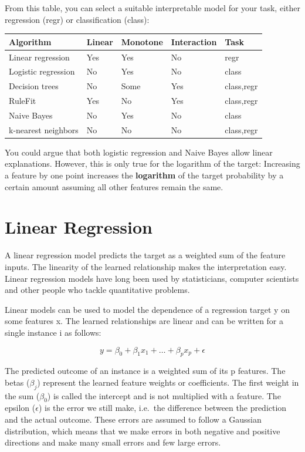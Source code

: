 \documentclass[
  10pt,
]{scrbook}
\begin{document}
From this table, you can select a suitable interpretable model for your task, either regression (regr) or classification (class):

\begin{longtable}[]{@{}lllll@{}}
\toprule
Algorithm & Linear & Monotone & Interaction & Task\tabularnewline
\midrule
\endhead
Linear regression & Yes & Yes & No & regr\tabularnewline
Logistic regression & No & Yes & No & class\tabularnewline
Decision trees & No & Some & Yes & class,regr\tabularnewline
RuleFit & Yes & No & Yes & class,regr\tabularnewline
Naive Bayes & No & Yes & No & class\tabularnewline
k-nearest neighbors & No & No & No & class,regr\tabularnewline
\bottomrule
\end{longtable}

You could argue that both logistic regression and Naive Bayes allow linear explanations.
However, this is only true for the logarithm of the target: Increasing a feature by one point increases the \textbf{logarithm} of the target probability by a certain amount assuming all other features remain the same.

\newpage

\hypertarget{limo}{%
\section{Linear Regression}\label{limo}}

A linear regression model predicts the target as a weighted sum of the feature inputs.
The linearity of the learned relationship makes the interpretation easy.
Linear regression models have long been used by statisticians, computer scientists and other people who tackle quantitative problems.

Linear models can be used to model the dependence of a regression target y on some features x.
The learned relationships are linear and can be written for a single instance i as follows:

\[y=\beta_{0}+\beta_{1}x_{1}+\ldots+\beta_{p}x_{p}+\epsilon\]

The predicted outcome of an instance is a weighted sum of its p features.
The betas (\(\beta_{j}\)) represent the learned feature weights or coefficients.
The first weight in the sum (\(\beta_0\)) is called the intercept and is not multiplied with a feature.
The epsilon (\(\epsilon\)) is the error we still make, i.e.~the difference between the prediction and the actual outcome.
These errors are assumed to follow a Gaussian distribution, which means that we make errors in both negative and positive directions and make many small errors and few large errors.
\end{document}
